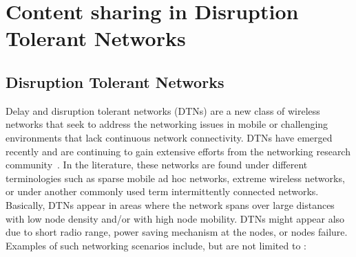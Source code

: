 \section{Content sharing in Disruption Tolerant Networks}

\subsection{Disruption Tolerant Networks}

Delay and disruption tolerant networks (DTNs) are a new class of wireless networks that seek to address the networking issues in mobile or challenging environments that lack
continuous network connectivity. DTNs have emerged recently and are continuing to gain extensive efforts from the networking research community~\cite{Bundle,fall03,dtnrg}. In the literature, these networks are found under different terminologies such as sparse mobile ad hoc networks, extreme wireless networks, or under another commonly used term intermittently connected networks. Basically, DTNs appear in areas where the network spans over large distances with low node density and/or with high node mobility. DTNs might appear also due to short radio range, power saving mechanism at the nodes, or nodes failure. Examples of such networking scenarios include, but are not limited to :

